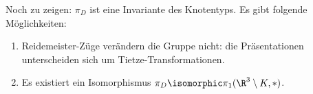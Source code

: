 Noch zu zeigen: $\pi_D$ ist eine Invariante des Knotentyps.
Es gibt folgende Möglichkeiten:
\begin{enumerate}[1)]
    \item
        Reidemeister-Züge verändern die Gruppe nicht: die Präsentationen unterscheiden sich um Tietze-Transformationen.
    \item
        Es existiert ein Isomorphismus $\pi_D \isomorphic \pi_1(\R^3 \setminus K, *)$.
\end{enumerate}



%
%
%
%
%

